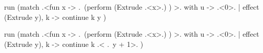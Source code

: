 \begin{code}
\begin{metaocaml}
run (match .<fun x -> .~(perform (Extrude .<x>.) ) >. 
             with u -> .<0>.
                | effect (Extrude y), k -> continue k y )
\end{metaocaml}
\end{code}


\begin{code}
\begin{metaocaml}
run (match .<fun x -> .~(perform (Extrude .<x>.) ) >. 
             with u -> .<0>.
                | effect (Extrude y), k -> continue k .< .~y + 1>. )
\end{metaocaml}
\end{code}